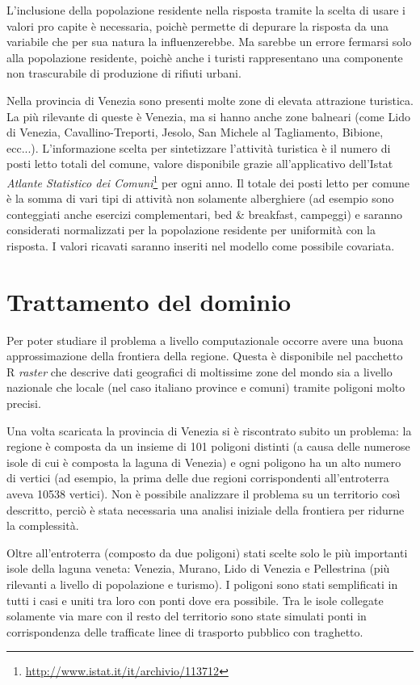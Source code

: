 \documentclass[a4paper,11pt,twoside,openright]{book}							%
\begin{document}
L'inclusione della popolazione residente nella risposta tramite la scelta di usare i valori pro capite è necessaria, poichè permette di depurare la risposta da una variabile che per sua natura la influenzerebbe. Ma sarebbe un errore fermarsi solo alla popolazione residente, poichè anche i turisti rappresentano una componente non trascurabile di produzione di rifiuti urbani.

Nella provincia di Venezia sono presenti molte zone di elevata attrazione turistica. La più rilevante di queste è Venezia, ma si hanno anche zone balneari (come Lido di Venezia, Cavallino-Treporti, Jesolo, San Michele al Tagliamento, Bibione, ecc...). L'informazione scelta per sintetizzare l'attività turistica è il numero di posti letto totali del comune, valore disponibile grazie all'applicativo dell'Istat \textit{Atlante Statistico dei Comuni}\footnote{\href{http://www.istat.it/it/archivio/113712}{http://www.istat.it/it/archivio/113712}} per ogni anno. Il totale dei posti letto per comune è la somma di vari tipi di attività non solamente alberghiere (ad esempio sono conteggiati anche esercizi complementari, bed \& breakfast, campeggi) e saranno considerati normalizzati per la popolazione residente per uniformità con la risposta. I valori ricavati saranno inseriti nel modello come possibile covariata.


\section{Trattamento del dominio}

Per poter studiare il problema a livello computazionale occorre avere una buona approssimazione della frontiera della regione. Questa è disponibile nel pacchetto R \textit{raster} che descrive dati geografici di moltissime zone del mondo sia a livello nazionale che locale (nel caso italiano province e comuni) tramite poligoni molto precisi.

Una volta scaricata la provincia di Venezia si è riscontrato subito un problema: la regione è composta da un insieme di 101 poligoni distinti (a causa delle numerose isole di cui è composta la laguna di Venezia) e ogni poligono ha un alto numero di vertici (ad esempio, la prima delle due regioni corrispondenti all'entroterra aveva 10538 vertici). Non è possibile analizzare il problema su un territorio così descritto, perciò è stata necessaria una analisi iniziale della frontiera per ridurne la complessità.

Oltre all'entroterra (composto da due poligoni) stati scelte solo le più importanti isole della laguna veneta: Venezia, Murano, Lido di Venezia e Pellestrina (più rilevanti a livello di popolazione e turismo). I poligoni sono stati semplificati in tutti i casi e uniti tra loro con ponti dove era possibile. Tra le isole collegate solamente via mare con il resto del territorio sono state simulati ponti in corrispondenza delle trafficate linee di trasporto pubblico con traghetto.
\end{document}
